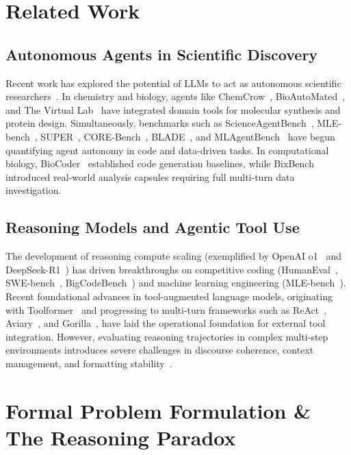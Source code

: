 \documentclass[11pt,letterpaper]{article}
\begin{document}
\section{Related Work}

\subsection{Autonomous Agents in Scientific Discovery}
Recent work has explored the potential of LLMs to act as autonomous scientific researchers~\cite{gao2024empowering,lu2024aiscientist}. In chemistry and biology, agents like ChemCrow~\cite{bran2023chemcrow}, BioAutoMated~\cite{sarwal2023biollm}, and The Virtual Lab~\cite{swanson2024virtuallab} have integrated domain tools for molecular synthesis and protein design. Simultaneously, benchmarks such as ScienceAgentBench~\cite{chen2024scienceagentbench}, MLE-bench~\cite{chan2024mlebench}, SUPER~\cite{bogin2024super}, CORE-Bench~\cite{siegel2024corebench}, BLADE~\cite{gu2024blade}, and MLAgentBench~\cite{huang2024mlagentbench} have begun quantifying agent autonomy in code and data-driven tasks. In computational biology, BioCoder~\cite{tang2024biocoder} established code generation baselines, while BixBench~\cite{mitchener2025bixbench} introduced real-world analysis capsules requiring full multi-turn data investigation.

\subsection{Reasoning Models and Agentic Tool Use}
The development of reasoning compute scaling (exemplified by OpenAI o1~\cite{openai2024o1} and DeepSeek-R1~\cite{guo2025deepseek}) has driven breakthroughs on competitive coding (HumanEval~\cite{chen2021codex}, SWE-bench~\cite{jimenez2024swebench}, BigCodeBench~\cite{zhuo2024bigcodebench}) and machine learning engineering (MLE-bench~\cite{chan2024mlebench}). Recent foundational advances in tool-augmented language models, originating with Toolformer~\cite{schick2023toolformer} and progressing to multi-turn frameworks such as ReAct~\cite{yao2023react}, Aviary~\cite{narayanan2024aviary}, and Gorilla~\cite{patil2023gorilla}, have laid the operational foundation for external tool integration. However, evaluating reasoning trajectories in complex multi-step environments introduces severe challenges in discourse coherence, context management, and formatting stability~\cite{tang2024mlbench,wijk2024rebench,russell2026storyscope}.

\section{Formal Problem Formulation \& The Reasoning Paradox}
\end{document}
